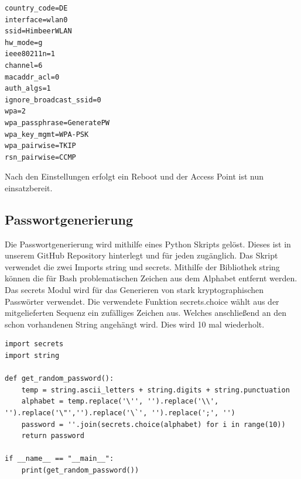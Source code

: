 \documentclass[a4paper,11pt,singlespacing]{article}
\begin{document}
                
                    \begin{lstlisting}
country_code=DE
interface=wlan0
ssid=HimbeerWLAN
hw_mode=g
ieee80211n=1
channel=6
macaddr_acl=0
auth_algs=1
ignore_broadcast_ssid=0
wpa=2
wpa_passphrase=GeneratePW
wpa_key_mgmt=WPA-PSK
wpa_pairwise=TKIP
rsn_pairwise=CCMP
                    \end{lstlisting} 
                   
                   Nach den Einstellungen erfolgt ein Reboot und der Access Point ist nun einsatzbereit.
                
                
            
    	\subsection{Passwortgenerierung}
    		Die Passwortgenerierung wird mithilfe eines Python Skripts gelöst. Dieses ist in unserem GitHub Repository hinterlegt und für jeden zugänglich. Das Skript verwendet die zwei Imports string und secrets. Mithilfe der Bibliothek string können die für Bash problematischen Zeichen aus dem Alphabet entfernt werden. Das secrets Modul wird für das Generieren von stark kryptographischen Passwörter verwendet. Die verwendete Funktion secrets.choice wählt aus der mitgelieferten Sequenz ein zufälliges Zeichen aus. Welches anschließend an den schon vorhandenen String angehängt wird. Dies wird 10 mal wiederholt.
    	
    	

            \begin{lstlisting}
import secrets
import string

def get_random_password():
	temp = string.ascii_letters + string.digits + string.punctuation
	alphabet = temp.replace('\'', '').replace('\\', '').replace('\"','').replace('\`', '').replace(';', '')
	password = ''.join(secrets.choice(alphabet) for i in range(10))
	return password

if __name__ == "__main__":
	print(get_random_password())
            \end{lstlisting}
    	
    	    

    	
\end{document}
